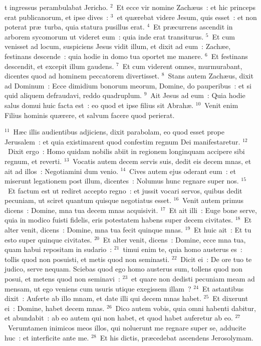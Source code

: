 \bchapter
{}t ingressus perambulabat Jericho.
${}^{2}$~Et ecce vir nomine Zach\ae us~: et hic princeps erat publicanorum, et ipse dives~:
${}^{3}$~et qu\ae rebat videre Jesum, quis esset~: et non poterat pr\ae\ turba, quia statura pusillus erat.
${}^{4}$~Et pr\ae currens ascendit in arborem sycomorum ut videret eum~: quia inde erat transiturus.
${}^{5}$~Et cum venisset ad locum, suspiciens Jesus vidit illum, et dixit ad eum~: Zach\ae e, festinans descende~: quia hodie in domo tua oportet me manere.
${}^{6}$~Et festinans descendit, et excepit illum gaudens.
${}^{7}$~Et cum viderent omnes, murmurabant, dicentes quod ad hominem peccatorem divertisset.
${}^{8}$~Stans autem Zach\ae us, dixit ad Dominum~: Ecce dimidium bonorum meorum, Domine, do pauperibus~: et si quid aliquem defraudavi, reddo quadruplum.
${}^{9}$~Ait Jesus ad eum~: Quia hodie salus domui huic facta est~: eo quod et ipse filius sit Abrah\ae .
${}^{10}$~Venit enim Filius hominis qu\ae rere, et salvum facere quod perierat.


${}^{11}$~H\ae c illis audientibus adjiciens, dixit parabolam, eo quod esset prope Jerusalem~: et quia existimarent quod confestim regnum Dei manifestaretur.
${}^{12}$~Dixit ergo~: Homo quidam nobilis abiit in regionem longinquam accipere sibi regnum, et reverti.
${}^{13}$~Vocatis autem decem servis suis, dedit eis decem mnas, et ait ad illos~: Negotiamini dum venio.
${}^{14}$~Cives autem ejus oderant eum~: et miserunt legationem post illum, dicentes~: Nolumus hunc regnare super nos.
${}^{15}$~Et factum est ut rediret accepto regno~: et jussit vocari servos, quibus dedit pecuniam, ut sciret quantum quisque negotiatus esset.
${}^{16}$~Venit autem primus dicens~: Domine, mna tua decem mnas acquisivit.
${}^{17}$~Et ait illi~: Euge bone serve, quia in modico fuisti fidelis, eris potestatem habens super decem civitates.
${}^{18}$~Et alter venit, dicens~: Domine, mna tua fecit quinque mnas.
${}^{19}$~Et huic ait~: Et tu esto super quinque civitates.
${}^{20}$~Et alter venit, dicens~: Domine, ecce mna tua, quam habui repositam in sudario~:
${}^{21}$~timui enim te, quia homo austerus es~: tollis quod non posuisti, et metis quod non seminasti.
${}^{22}$~Dicit ei~: De ore tuo te judico, serve nequam. Sciebas quod ego homo austerus sum, tollens quod non posui, et metens quod non seminavi~:
${}^{23}$~et quare non dedisti pecuniam meam ad mensam, ut ego veniens cum usuris utique exegissem illam~?
${}^{24}$~Et astantibus dixit~: Auferte ab illo mnam, et date illi qui decem mnas habet.
${}^{25}$~Et dixerunt ei~: Domine, habet decem mnas.
${}^{26}$~Dico autem vobis, quia omni habenti dabitur, et abundabit~: ab eo autem qui non habet, et quod habet auferetur ab eo.
${}^{27}$~Verumtamen inimicos meos illos, qui noluerunt me regnare super se, adducite huc~: et interficite ante me.
${}^{28}$~Et his dictis, pr\ae cedebat ascendens Jerosolymam.


